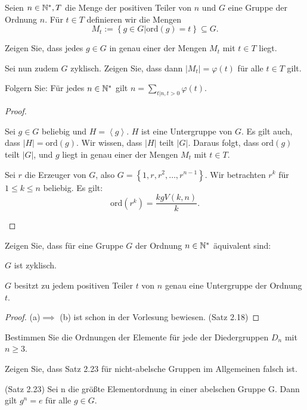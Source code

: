 \begin{Problem}
	Seien $n\in \mathbb{N}^*, T$ die Menge der positiven Teiler von $n$ und $G$ eine Gruppe der Ordnung $n$. F\"{u}r $t\in T$ definieren wir die Mengen
	\[
		M_t:=\left\{ g\in G|\text{ord}(g)=t \right\} \subseteq G
	.\] 
	\begin{parts}
		\item Zeigen Sie, dass jedes $g\in G$ in genau einer der Mengen $M_t$ mit $t\in T$ liegt.
		\item Sei nun zudem $G$ zyklisch. Zeigen Sie, dass dann $|M_t|=\varphi(t)$ f\"{u}r alle $t\in T$ gilt.
		\item Folgern Sie: F\"{u}r jedes $n\in \mathbb{N}^*$ gilt $n=\sum_{t|n, t>0}\varphi(t)$.
	\end{parts}
\end{Problem}
\begin{proof}
	\begin{parts}
	\item Sei $g\in G$ beliebig und $H=\left<g \right>$. $H$ ist eine Untergruppe von $G$. Es gilt auch, dass $|H|=\text{ord}(g)$. Wir wissen, dass $|H|$ teilt $|G|$. Daraus folgt, dass $\text{ord}(g)$ teilt $|G|$, und $g$ liegt in genau einer der Mengen $M_t$ mit $t\in T$.
	\item Sei $r$ die Erzeuger von $G$, also $G=\left\{1, r,r^2,\dots,r^{n-1} \right\} $. Wir betrachten $r^k$ f\"{u}r $1\le k \le n$ beliebig. Es gilt:
		\[
			\text{ord}(r^k)=\frac{kgV(k,n)}{k}
		.\] 
	\end{parts}
\end{proof}
\begin{Problem}
	Zeigen Sie, dass für eine Gruppe $G$ der Ordnung $n \in \mathbb{N}^*$ äquivalent sind:
	\begin{parts}
	\item $G$ ist zyklisch.
	\item $G$ besitzt zu jedem positiven Teiler $t$ von $n$ genau eine Untergruppe der Ordnung $t$.
	\end{parts}
\end{Problem}
\begin{proof}
	(a)$\implies$ (b) ist schon in der Vorlesung bewiesen. (Satz 2.18)
\end{proof}
\begin{Problem}
	\begin{parts}
	\item  Bestimmen Sie die Ordnungen der Elemente für jede der Diedergruppen $D_n$ mit $n\ge 3$.
	\item  Zeigen Sie, dass Satz 2.23 für nicht-abelsche Gruppen im Allgemeinen falsch ist.
		\begin{tcolorbox}
			(Satz 2.23) Sei n die größte Elementordnung in einer abelschen Gruppe G. Dann gilt $g^n = e$ für alle $g \in G$.
		\end{tcolorbox}
	\end{parts}
\end{Problem}

